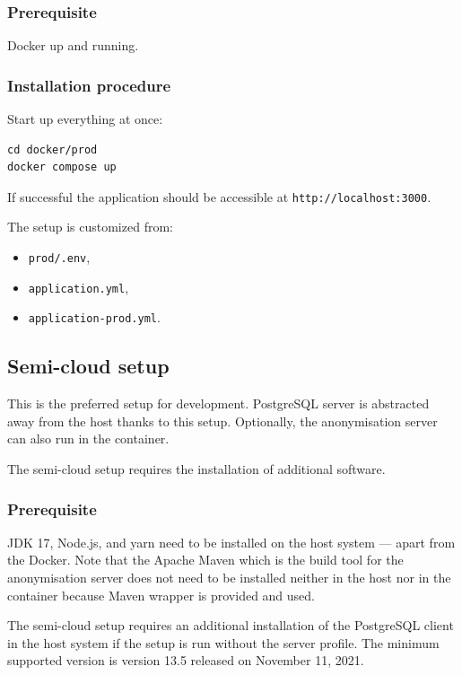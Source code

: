 \documentclass[a4paper,twoside,12pt]{book}
\begin{document}
\subsubsection{Prerequisite}

Docker up and running.

\subsubsection{Installation procedure}

Start up everything at once:

\begin{verbatim}
cd docker/prod
docker compose up
\end{verbatim}

If successful the application should be accessible at \verb|http://localhost:3000|.

The setup is customized from:
\begin{itemize}
\item \verb|prod/.env|,
\item \verb|application.yml|,
\item \verb|application-prod.yml|.
\end{itemize}


\subsection{Semi-cloud setup}

This is the preferred setup for development. PostgreSQL server is abstracted away from the host thanks to this setup. Optionally, the anonymisation server can also run in the container.

The semi-cloud setup requires the installation of additional software.

\subsubsection{Prerequisite}

JDK 17, Node.js, and yarn need to be installed on the host system — apart from the Docker. Note that the Apache Maven which is the build tool for the anonymisation server does not need to be installed neither in the host nor in the container because Maven wrapper is provided and used.

The semi-cloud setup requires an additional installation of the PostgreSQL client in the host system if the setup is run without the server profile. The minimum supported version is version 13.5 released on November 11, 2021.
\end{document}
